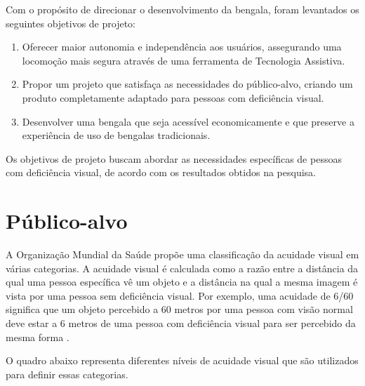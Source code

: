Com o propósito de direcionar o desenvolvimento da bengala, foram levantados os seguintes objetivos de projeto:
\begin{enumerate}
    \item Oferecer maior autonomia e independência aos usuários, assegurando uma locomoção mais segura através de uma ferramenta de Tecnologia Assistiva.
    \item Propor um projeto que satisfaça as necessidades do público-alvo, criando um produto completamente adaptado para pessoas com deficiência visual.
    \item Desenvolver uma bengala que seja acessível economicamente e que preserve a experiência de uso de bengalas tradicionais.
\end{enumerate}

Os objetivos de projeto buscam abordar as necessidades específicas de pessoas com deficiência visual, de acordo com os resultados obtidos na pesquisa.



\section{Público-alvo}

A Organização Mundial da Saúde propõe uma classificação da acuidade visual em várias categorias. A acuidade visual é calculada como a razão entre a distância da qual uma pessoa específica vê um objeto e a distância na qual a mesma imagem é vista por uma pessoa sem deficiência visual. Por exemplo, uma acuidade de 6/60 significa que um objeto percebido a 60 metros por uma pessoa com visão normal deve estar a 6 metros de uma pessoa com deficiência visual para ser percebido da mesma forma \cite{brock-2013}. 

O quadro abaixo representa diferentes níveis de acuidade visual que são utilizados para definir essas categorias.

